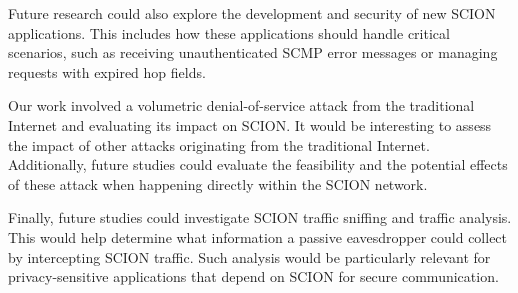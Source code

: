 Future research could also explore the development and security of new SCION applications.
This includes how these applications should handle critical scenarios, such as receiving unauthenticated SCMP error messages or managing requests with expired hop fields.

Our work involved a volumetric denial-of-service attack from the traditional Internet and evaluating its impact on SCION.
It would be interesting to assess the impact of other attacks originating from the traditional Internet.
Additionally, future studies could evaluate the feasibility and the potential effects of these attack when happening directly within the SCION network.

Finally, future studies could investigate SCION traffic sniffing and traffic analysis.
This would help determine what information a passive eavesdropper could collect by intercepting SCION traffic.
Such analysis would be particularly relevant for privacy-sensitive applications that depend on SCION for secure communication.

